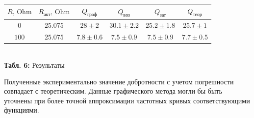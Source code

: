 \documentclass[12pt,a4paper]{scrartcl}
\begin{document}
	\begin{center}
		\begin{tabular}{|c|c|c|c|c|c|} \hline
			$R,\, \mathrm{Ohm}$ & $R_\text{акт},\, \mathrm{Ohm}$ & $Q_\text{граф}$ & $Q_\text{воз}$ & $Q_\text{зат}$ & $Q_\text{теор}$ \\\hline
			$0$ & $25.075$ & $28 \pm 2$ & $30.1 \pm 2.2$ & $25.2 \pm 1.8$ & $25.7 \pm 1$ \\\hline
			$100$ & $25.075$ & $7.8 \pm 0.6$ & $7.5 \pm 0.9$ & $7.5 \pm 0.9$ & $7.7 \pm 0.5$ \\\hline 
		\end{tabular}
		\\\textbf{Табл. 6:} Результаты
	\end{center}

	Полученные экспериментально значение добротности с учетом погрешности совпадает с теоретическим. Данные графического метода могли бы быть уточнены при более точной аппроксимации частотных кривых соответствующими функциями.
	
\end{document}
